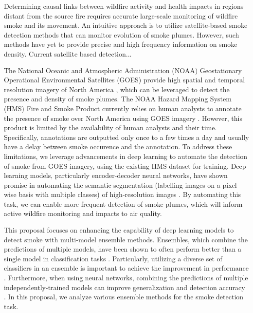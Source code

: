\documentclass{article}
\begin{document}
Determining causal links between wildfire activity and health impacts in regions distant from the source fire requires accurate large-scale monitoring of wildfire smoke and its movement. An intuitive approach is to utilize satellite-based smoke detection methods that can monitor evolution of smoke plumes. However, such methods have yet to provide precise and high frequency information on smoke density. Current satellite based detection...

The National Oceanic and Atmospheric Administration (NOAA) Geostationary Operational Environmental Satellites (GOES) provide high spatial and temporal resolution imagery of North America \citep{GOESbook}, which can be leveraged to detect the presence and density of smoke plumes. The NOAA Hazard Mapping System (HMS) Fire and Smoke Product currently relies on human analysts to annotate the presence of smoke over North America using GOES imagery \citep{hms}. However, this product is limited by the availability of human analysts and their time. Specifically, annotations are outputted only once to a few times a day and usually have a delay between smoke occurence and the annotation. To address these limitations, we leverage advancements in deep learning to automate the detection of smoke from GOES imagery, using the existing HMS dataset for training. Deep learning models, particularly encoder-decoder neural networks, have shown promise in automating the semantic segmentation (labelling images on a pixel-wise basis with multiple classes) of high-resolution images \citep{cv-segmentation-review}. By automating this task, we can enable more frequent detection of smoke plumes, which will inform active wildfire monitoring and impacts to air quality.

This proposal focuses on enhancing the capability of deep learning models to detect smoke with multi-model ensemble methods. Ensembles, which combine the predictions of multiple models, have been shown to often perform better than a single model in classification tasks \citep{ensemble-ml}. Particularly, utilizing a diverse set of classifiers in an ensemble is important to achieve the improvement in performance \citep{ensemble-diversity}. Furthermore, when using neural networks, combining the predictions of multiple independently-trained models can improve generalization and detection accuracy \citep{nn-ensemble,nn-ensemble2, nn-error-ens}. In this proposal, we analyze various ensemble methods for the smoke detection task.
\end{document}

